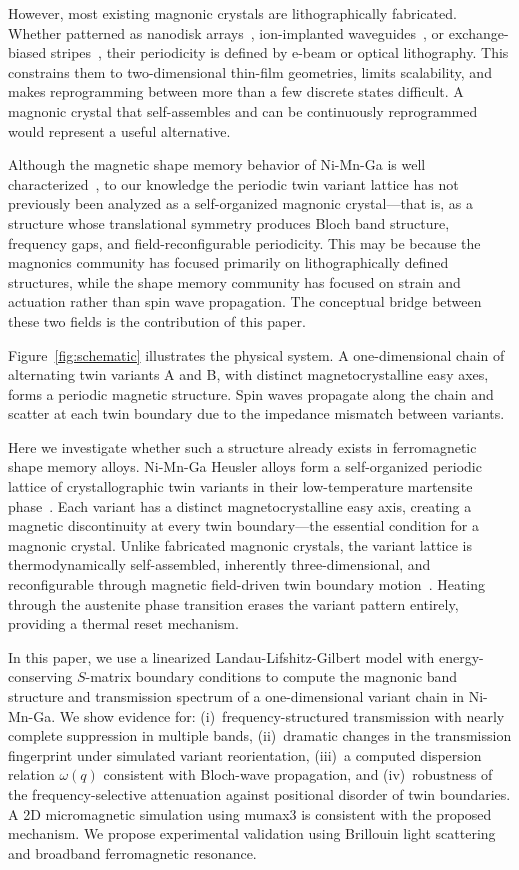 \documentclass[aip,jap,reprint,floatfix,nofootinbib]{revtex4-2}
\begin{document}
However, most existing magnonic crystals are lithographically fabricated. Whether patterned as nanodisk arrays~\cite{Ding2021}, ion-implanted waveguides~\cite{Obry2013}, or exchange-biased stripes~\cite{Heussner2020}, their periodicity is defined by e-beam or optical lithography. This constrains them to two-dimensional thin-film geometries, limits scalability, and makes reprogramming between more than a few discrete states difficult. A magnonic crystal that self-assembles and can be continuously reprogrammed would represent a useful alternative.

Although the magnetic shape memory behavior of Ni-Mn-Ga is well characterized~\cite{Heczko2014}, to our knowledge the periodic twin variant lattice has not previously been analyzed as a self-organized magnonic crystal---that is, as a structure whose translational symmetry produces Bloch band structure, frequency gaps, and field-reconfigurable periodicity. This may be because the magnonics community has focused primarily on lithographically defined structures, while the shape memory community has focused on strain and actuation rather than spin wave propagation. The conceptual bridge between these two fields is the contribution of this paper.

Figure~\ref{fig:schematic} illustrates the physical system. A one-dimensional chain of alternating twin variants A and B, with distinct magnetocrystalline easy axes, forms a periodic magnetic structure. Spin waves propagate along the chain and scatter at each twin boundary due to the impedance mismatch between variants.

Here we investigate whether such a structure already exists in ferromagnetic shape memory alloys. Ni-Mn-Ga Heusler alloys form a self-organized periodic lattice of crystallographic twin variants in their low-temperature martensite phase~\cite{Webster1984,Ullakko1996}. Each variant has a distinct magnetocrystalline easy axis, creating a magnetic discontinuity at every twin boundary---the essential condition for a magnonic crystal. Unlike fabricated magnonic crystals, the variant lattice is thermodynamically self-assembled, inherently three-dimensional, and reconfigurable through magnetic field-driven twin boundary motion~\cite{Heczko2014}. Heating through the austenite phase transition erases the variant pattern entirely, providing a thermal reset mechanism.

In this paper, we use a linearized Landau-Lifshitz-Gilbert model with energy-conserving $S$-matrix boundary conditions to compute the magnonic band structure and transmission spectrum of a one-dimensional variant chain in Ni-Mn-Ga. We show evidence for: (i)~frequency-structured transmission with nearly complete suppression in multiple bands, (ii)~dramatic changes in the transmission fingerprint under simulated variant reorientation, (iii)~a computed dispersion relation $\omega(q)$ consistent with Bloch-wave propagation, and (iv)~robustness of the frequency-selective attenuation against positional disorder of twin boundaries. A 2D micromagnetic simulation using mumax3 is consistent with the proposed mechanism. We propose experimental validation using Brillouin light scattering and broadband ferromagnetic resonance.
\end{document}
